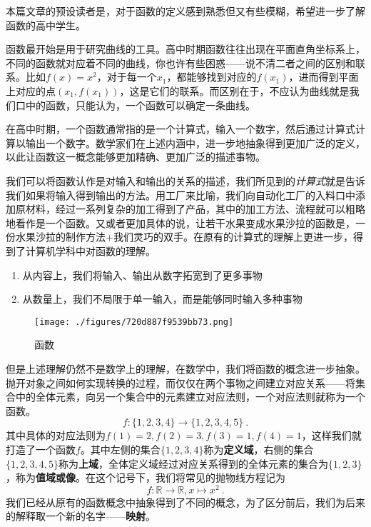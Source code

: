 

\begin{issues}
\issueDraft
\issueTODO
\end{issues}

本篇文章的预设读者是，对于函数的定义感到熟悉但又有些模糊，希望进一步了解函数的高中学生。

函数最开始是用于研究曲线的工具。高中时期函数往往出现在平面直角坐标系上，不同的函数就对应着不同的曲线，你也许有些困惑——说不清二者之间的区别和联系。比如$f(x)=x^2$，对于每一个$x_1$，都能够找到对应的$f(x_1)$，进而得到平面上对应的点$(x_1,f(x_1))$，这是它们的联系。而区别在于，不应认为曲线就是我们口中的函数，只能认为，一个函数可以确定一条曲线。

在高中时期，一个函数通常指的是一个计算式，输入一个数字，然后通过计算式计算以输出一个数字。数学家们在上述内涵中，进一步地抽象得到更加广泛的定义，以此让函数这一概念能够更加精确、更加广泛的描述事物。

我们可以将函数认作是对输入和输出的关系的描述，我们所见到的\textsl{计算式}就是告诉我们如果将输入得到输出的方法。用工厂来比喻，我们向自动化工厂的入料口中添加原材料，经过一系列复杂的加工得到了产品，其中的加工方法、流程就可以粗略地看作是一个函数。又或者更加具体的说，让若干水果变成水果沙拉的函数是，一份水果沙拉的制作方法+我们灵巧的双手。在原有的计算式的理解上更进一步，得到了计算机学科中对函数的理解。
\begin{enumerate}
\item 从内容上，我们将输入、输出从数字拓宽到了更多事物
\item 从数量上，我们不局限于单一输入，而是能够同时输入多种事物
\end{enumerate}


\begin{figure}[ht]
\centering
\texttt{[image: ./figures/720d887f9539bb73.png]}
\caption{函数} \label{fig_functi_1}
\end{figure}

但是上述理解仍然不是数学上的理解，在数学中，我们将函数的概念进一步抽象。抛开对象之间如何实现转换的过程，而仅仅在两个事物之间建立对应关系——将集合中的全体元素，向另一个集合中的元素建立对应法则，一个对应法则就称为一个函数。
$$f:\{1,2,3,4\}\to\{1,2,3,4,5\}~.$$
其中具体的对应法则为$f(1)=2,f(2)=3,f(3)=1,f(4)=1$，这样我们就打造了一个函数$f$。其中左侧的集合$\{1,2,3,4\}$称为\textbf{定义域}，右侧的集合$\{1,2,3,4,5\}$称为\textbf{上域}，全体定义域经过对应关系得到的全体元素的集合为$\{1,2,3\}$，称为\textbf{值域或像}。在这个记号下，我们将常见的抛物线方程记为
\begin{equation}
f:\mathbb{R}\to{\mathbb{R}},x\mapsto{x^2}~.
\end{equation}
我们已经从原有的函数概念中抽象得到了不同的概念，为了区分前后，我们为后来的解释取一个新的名字——\textbf{映射}。

